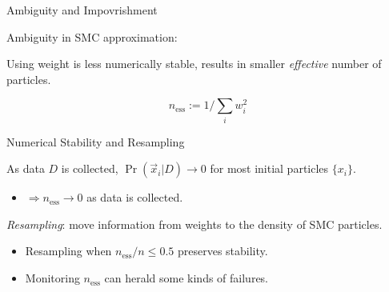 \documentclass[xcolor=dvipsnames, compress]{beamer}
\newcommand{\defeq}{\mathrel{:=}}
\begin{document}
\begin{frame}{Ambiguity and Impovrishment}

  Ambiguity in SMC approximation:
  \begin{figure}%

    \vspace{-0.75em}%
    \makebox[0.2\textwidth][c]{}%
    \makebox[0.2\textwidth][c]{}
  \end{figure}

  \pause

  Using weight is less numerically stable, results in smaller \emph{effective}
  number of particles.

  \[
    n_{\text{ess}} \defeq 1 / \sum_i w_i^2
  \]

\end{frame}

\begin{frame}{Numerical Stability and Resampling}

  As data $D$ is collected, $\Pr(\vec{x}_i | D) \to 0$ for most
  initial particles $\{x_i\}$.

  \begin{itemize}
    \item $\Rightarrow n_{\text{ess}} \to 0$ as data is collected.
  \end{itemize}

  \emph{Resampling}: move information from weights
  to the density of SMC particles.

  \begin{itemize}
    \item Resampling when $n_{\text{ess}} / n \le 0.5$ preserves stability.
    \item Monitoring $n_{\text{ess}}$ can herald some kinds of failures.
  \end{itemize}

\end{frame}
 
\end{document}

